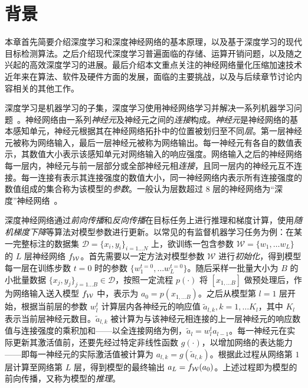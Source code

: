 \chapter{背景} \label{chap::background}
本章首先简要介绍深度学习和深度神经网络的基本原理，以及基于深度学习的现代目标检测算法。之后介绍现代深度学习普遍面临的存储、运算开销问题，以及随之兴起的高效深度学习的进展。最后介绍本文重点关注的神经网络量化压缩加速技术近年来在算法、软件及硬件方面的发展，面临的主要挑战，以及与后续章节讨论内容相关的其他工作。

深度学习是机器学习的子集，深度学习使用神经网络学习并解决一系列机器学习问题~\citep{lecun2015deep}。神经网络由一系列\emph{神经元}及神经元之间的\emph{连接}构成。\emph{神经元}是神经网络的基本感知单元，神经元根据其在神经网络拓扑中的位置被划归至不同\emph{层}。第一层神经元被称为网络输入，最后一层神经元被称为网络输出。每一神经元有各自的数值表示，其数值大小表示该感知单元对网络输入的响应强度。网络输入之后的神经网络每一层内，神经元与前一层部分或全部神经元相\emph{连接}，且同一层内的神经元互不连接。每一连接有表示其连接强度的数值大小，同一神经网络内表示所有连接强度的数值组成的集合称为该模型的\emph{参数}。一般认为层数超过 8 层的神经网络为“深度”神经网络~\citep{krizhevsky2012imagenet}。

深度神经网络通过\emph{前向传播}和\emph{反向传播}在目标任务上进行推理和梯度计算，使用\emph{随机梯度下降}等算法对模型参数进行更新。以常见的有监督机器学习任务为例：在某一完整标注的数据集 $\mathcal{D} = \{x_i, y_i\}_{i=1\ldots N}$ 上，欲训练一包含参数 $\mathcal{W} = \{w_1, \ldots w_L\}$ 的 $L$ 层神经网络 $f_{\mathcal{W}}$。首先需要以一定方法对模型参数 $\mathcal{W}$ 进行\emph{初始化}，得到模型每一层在训练步数 $t=0$ 时的参数 $\{w_1^{t=0}, \ldots w_L^{t=0}\}$。随后采样一批量大小为 $B$ 的小批量数据 $\{x_j, y_j\}_{j=1\ldots B} \in \mathcal{D}$，按照一定流程 $p(\cdot)$ 将 $[x_{1, \ldots B}]$ 做预处理后，作为网络输入送入模型 $f_{\mathcal{W}}$ 中，表示为 $a_0 = p(x_{1, \ldots B})$。之后从模型第 $l=1$ 层开始，根据当前层的参数 $w_l^t$ 计算层内各神经元的响应值 $\tilde{a}_{l, k}, k = 1, \ldots K_l$，其中 $K_l$ 表示当前层神经元数目。$\tilde{a}_{l, k}$ 被计算为与该神经元相连接的上一层神经元的响应数值与连接强度的乘积加和——以全连接网络为例，$\tilde{a}_l = w_l^t a_{l-1}$。每一神经元在实际更新其激活值前，还要先经过特定非线性函数 $g(\cdot)$，以增加网络的表达能力——即每一神经元的实际激活值被计算为 $a_{l, k} = g(\tilde{a}_{l, k})$。根据此过程从网络第 $1$ 层计算至网络第 $L$ 层，得到模型的最终输出 $a_L = f_{\mathcal{W}}(a_0)$。上述过程即为模型的前向传播，又称为模型的\emph{推理}。

